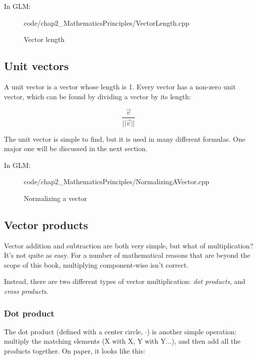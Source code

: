 In GLM:

\begin{figure}[ht]
    \centering
    \colorbox{backgroundcolor}{
        \parbox{0.9\textwidth}{
            
            {code/chap2_MathematicsPrinciples/VectorLength.cpp}
        }
    }
    \caption{Vector length}
    \label{fig:Vector length}
\end{figure}

\subsection{\textsf{Unit vectors}}
A unit vector is a vector whose length is 1. Every vector has a non-zero unit vector, which can be found by dividing a vector by its length:


\begin{equation*}
    \frac{\vec{v}}{||\vec{v} ||}
\end{equation*}

The unit vector is simple to find, but it is used in many different formulas. One major one will be discussed in the next section.

In GLM:

\begin{figure}[ht]
    \centering
    \colorbox{backgroundcolor}{
        \parbox{0.9\textwidth}{
            
            {code/chap2_MathematicsPrinciples/NormalizingAVector.cpp}
        }
    }
    \caption{Normalizing a vector}
    \label{fig:normalizing_a_vector}
\end{figure}

\subsection{\textsf{Vector products}}
Vector addition and subtraction are both very simple, but what of multiplication? It's not quite as easy. For a number of mathematical reasons that are beyond the scope of this book, multiplying component-wise isn't correct.

Instead, there are two different types of vector multiplication: \emph{dot products}, and \emph{cross products}.

\subsubsection{\textsf{Dot product}}
The dot product (defined with a center circle, $\cdot$) is another simple operation: multiply the matching elements (X with X, Y with Y...), and then add all the products together. On paper, it looks like this:

